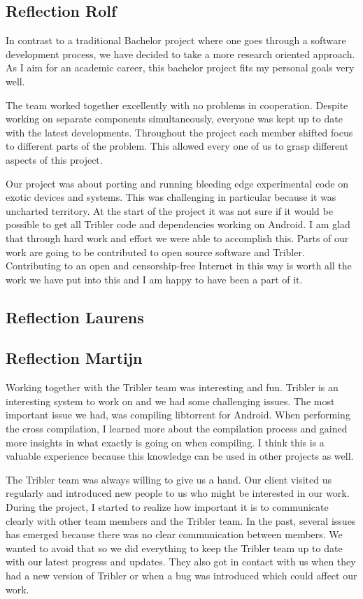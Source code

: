 		\subsection{Reflection Rolf}
		In contrast to a traditional Bachelor project where one goes through a software development process, we have decided to take a more research oriented approach. As I aim for an academic career, this bachelor project fits my personal goals very well.
		
		The team worked together excellently with no problems in cooperation. Despite working on separate components simultaneously, everyone was kept up to date with the latest developments. Throughout the project each member shifted focus to different parts of the problem. This allowed every one of us to grasp different aspects of this project.
		
		Our project was about porting and running bleeding edge experimental code on exotic devices and systems. This was challenging in particular because it was uncharted territory. At the start of the project it was not sure if it would be possible to get all Tribler code and dependencies working on Android. I am glad that through hard work and effort we were able to accomplish this. Parts of our work are going to be contributed to open source software and Tribler. Contributing to an open and censorship-free Internet in this way is worth all the work we have put into this and I am happy to have been a part of it.
		
		\subsection{Reflection Laurens}
		
		\subsection{Reflection Martijn}
		Working together with the Tribler team was interesting and fun. Tribler is an interesting system to work on and we had some challenging issues. The most important issue we had, was compiling libtorrent for Android. When performing the cross compilation, I learned more about the compilation process and gained more insights in what exactly is going on when compiling. I think this is a valuable experience because this knowledge can be used in other projects as well.
		
		The Tribler team was always willing to give us a hand. Our client visited us regularly and introduced new people to us who might be interested in our work. During the project, I started to realize how important it is to communicate clearly with other team members and the Tribler team. In the past, several issues has emerged because there was no clear communication between members. We wanted to avoid that so we did everything to keep the Tribler team up to date with our latest progress and updates. They also got in contact with us when they had a new version of Tribler or when a bug was introduced which could affect our work.
		
